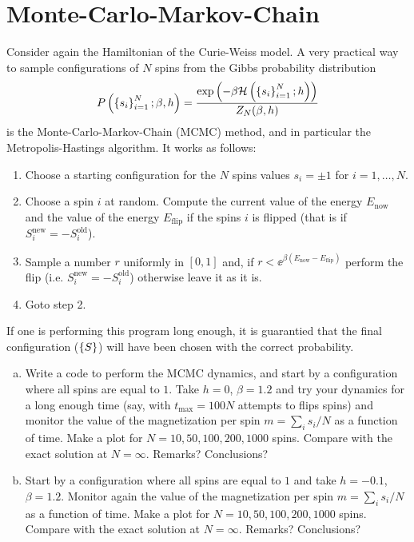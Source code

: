\documentclass[a4paper,oneside,12pt]{article}
\begin{document}
\section*{Monte-Carlo-Markov-Chain}
Consider again the Hamiltonian of the Curie-Weiss model. 
A very practical way to sample configurations of $ N $ spins from the Gibbs probability distribution
\begin{equation*}
    P \left(  \left\lbrace  s_i  \right\rbrace_{i=1}^N; \beta, h  \right) = \frac{ \exp \left(  -\beta \mathcal{H} \left(  \left\lbrace  s_i  \right\rbrace_{i=1}^N; h  \right)  \right) }{ Z_N(\beta, h) }
\end{equation*}
is the Monte-Carlo-Markov-Chain (MCMC) method, and in particular the Metropolis-Hastings algorithm. 
It works as follows:
\begin{enumerate}
\item   Choose a starting configuration for the $ N $ spins values $ s_i = \pm 1 $ for $ i=1,\ldots,N $.
\item   Choose a spin $ i $ at random. Compute the current value of the energy $ E_{\mathrm{now}} $ and the value of the energy $ E_{\mathrm{flip}} $ if the spins $ i $ is flipped (that is if $ S^{\mathrm{new}}_i = -S^{\mathrm{old}}_i $).
\item   Sample a number $ r $ uniformly in $ [0,1] $ and, if $ r < \ee^{\beta (E_{\mathrm{now}} - E_{\mathrm{flip}})} $ perform the flip (i.e. $ S^{\mathrm{new}}_i = -S^{\mathrm{old}}_i $) otherwise leave it as it is.
\item   Goto step 2.
\end{enumerate}
If one is performing this program long enough, it is guarantied that the final configuration ($ \left\lbrace  S  \right\rbrace $) will have been chosen with the correct probability.
\begin{enumerate}[(a)]
\item 
        Write a code to perform the MCMC dynamics, and start by a configuration where all spins are equal to $ 1 $. 
        Take $ h = 0 $, $ \beta = 1.2 $ and try your dynamics for a long enough time (say, with $ t_{\mathrm{max}} = 100 N $ attempts to flips spins) and monitor the value of the magnetization per spin $ m = \sum_i s_i/N $ as a function of time. 
        Make a plot for $ N=10,50,100,200,1000 $ spins. 
        Compare with the exact solution at $ N = \infty $. 
        Remarks? Conclusions?
\item 
        Start by a configuration where all spins are equal to $ 1 $ and take $ h = -0.1 $, $ \beta = 1.2 $.
        Monitor again the value of the magnetization per spin $ m = \sum_i s_i/N $ as a function of time. 
        Make a plot for $ N = 10,50,100,200,1000 $ spins.
        Compare with the exact solution at $ N = \infty $. 
        Remarks? Conclusions?
\end{enumerate}
\end{document}
